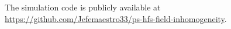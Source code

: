 \documentclass[twocolumn,pra,aps,superscriptaddress,floatfix,10pt]{revtex4-2}
\begin{document}
\begin{acknowledgments}
The simulation code is publicly available at \url{https://github.com/Jefemaestro33/ps-hfs-field-inhomogeneity}.
\end{acknowledgments}


\end{document}
